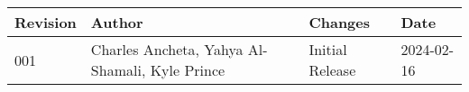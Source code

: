 \begin{table}[H]
	\begin{tabularx}{\textwidth}{| a | x | a | a |}
		\hline
		\textbf{Revision} & \textbf{Author}                                & \textbf{Changes} & \textbf{Date} \\
		\hline
		001               & Charles Ancheta, Yahya Al-Shamali, Kyle Prince & Initial Release  & 2024-02-16    \\ \hline
	\end{tabularx}
\end{table}


